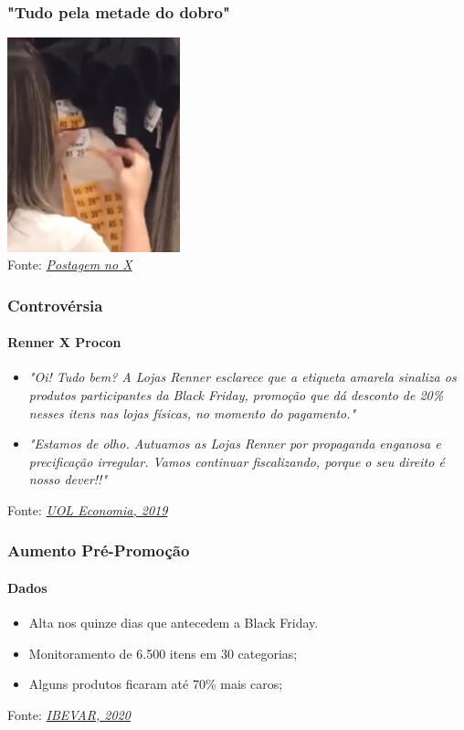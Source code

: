 \documentclass[compress,12pt]{beamer}
\begin{document}
\begin{frame}
    \frametitle{"Tudo pela metade do dobro"}
    \centering
    \includegraphics[width=50mm]{Imagens/adesivo.png} \\
    Fonte: \href{https://twitter.com/johnniefiveoh/status/1200008089375772672}{\textit{Postagem no X}}
\end{frame}

\begin{frame}
    \frametitle{Controvérsia}
    \framesubtitle{Renner X Procon}
    \begin{itemize}
        \item \textit{"Oi! Tudo bem? A Lojas Renner esclarece que a etiqueta amarela sinaliza os produtos participantes da Black Friday, promoção que dá desconto de 20\% nesses itens nas lojas físicas, no momento do pagamento."}
        \item \textit{"Estamos de olho. Autuamos as Lojas Renner por propaganda enganosa e precificação irregular. Vamos continuar fiscalizando, porque o seu direito é nosso dever!!"}
    \end{itemize}
    Fonte: \href{https://economia.uol.com.br/noticias/redacao/2019/11/29/empresa-se-defende-apos-video-sobre-falsa-promocao-viralizar-no-twitter.htm}{\textit{UOL Economia, 2019}}
\end{frame}

\begin{frame}
    \frametitle{Aumento Pré-Promoção}
    \framesubtitle{Dados}
    \begin{itemize}
        \item Alta nos quinze dias que antecedem a Black Friday.
        \item Monitoramento de 6.500 itens em 30 categorias;
        \item Alguns produtos ficaram até 70\% mais caros;
    \end{itemize}
    Fonte: \href{https://shorturl.at/a2456}{\textit{IBEVAR, 2020}}
\end{frame}
\end{document}
